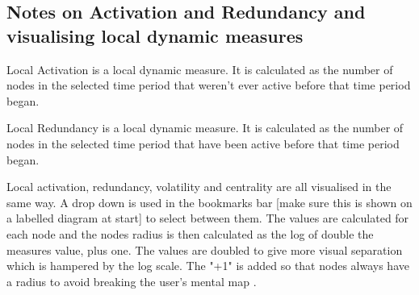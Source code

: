\subsection{Notes on Activation and Redundancy and visualising local dynamic measures}

Local Activation is a local dynamic measure. It is calculated as the number of nodes in the selected time period that weren't ever active before that time period began.

Local Redundancy is a local dynamic measure. It is calculated as the number of nodes in the selected time period that have been active before that time period began.

Local activation, redundancy, volatility and centrality are all visualised in the same way. A drop down is used in the bookmarks bar [make sure this is shown on a labelled diagram at start] to select between them. The values are calculated for each node and the nodes radius is then calculated as the log of double the measures value, plus one. The values are doubled to give more visual separation which is hampered by the log scale. The "+1" is added so that nodes always have a radius to avoid breaking the user's mental map \cite{}.